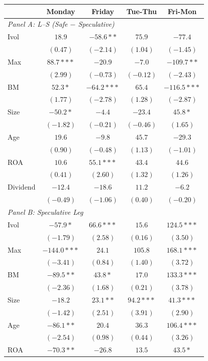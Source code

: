 \centering
\footnotesize
\begin{tabular}{l c c c c}
\toprule
 & Monday & Friday & Tue-Thu & Fri-Mon \\
\midrule
\multicolumn{5}{l}{\textit{Panel A: L--S (Safe $-$ Speculative)}} \\
Ivol & $18.9$ & $-58.6**$ & $75.9$ & $-77.4$ \\
 & $(0.47)$ & $(-2.14)$ & $(1.04)$ & $(-1.45)$ \\
Max & $88.7***$ & $-20.9$ & $-7.0$ & $-109.7**$ \\
 & $(2.99)$ & $(-0.73)$ & $(-0.12)$ & $(-2.43)$ \\
BM & $52.3*$ & $-64.2***$ & $65.4$ & $-116.5***$ \\
 & $(1.77)$ & $(-2.78)$ & $(1.28)$ & $(-2.87)$ \\
Size & $-50.2*$ & $-4.4$ & $-23.4$ & $45.8*$ \\
 & $(-1.82)$ & $(-0.21)$ & $(-0.46)$ & $(1.65)$ \\
Age & $19.6$ & $-9.8$ & $45.7$ & $-29.3$ \\
 & $(0.90)$ & $(-0.48)$ & $(1.13)$ & $(-1.01)$ \\
ROA & $10.6$ & $55.1***$ & $43.4$ & $44.6$ \\
 & $(0.41)$ & $(2.60)$ & $(1.32)$ & $(1.26)$ \\
Dividend & $-12.4$ & $-18.6$ & $11.2$ & $-6.2$ \\
 & $(-0.49)$ & $(-1.06)$ & $(0.40)$ & $(-0.20)$ \\
\midrule
\multicolumn{5}{l}{\textit{Panel B: Speculative Leg}} \\
Ivol & $-57.9*$ & $66.6***$ & $15.6$ & $124.5***$ \\
 & $(-1.79)$ & $(2.58)$ & $(0.16)$ & $(3.50)$ \\
Max & $-144.0***$ & $24.1$ & $105.8$ & $168.1***$ \\
 & $(-3.41)$ & $(0.84)$ & $(1.40)$ & $(3.72)$ \\
BM & $-89.5**$ & $43.8*$ & $17.0$ & $133.3***$ \\
 & $(-2.36)$ & $(1.68)$ & $(0.21)$ & $(3.78)$ \\
Size & $-18.2$ & $23.1**$ & $94.2***$ & $41.3***$ \\
 & $(-1.42)$ & $(2.51)$ & $(3.91)$ & $(2.90)$ \\
Age & $-86.1**$ & $20.4$ & $36.3$ & $106.4***$ \\
 & $(-2.54)$ & $(0.98)$ & $(0.44)$ & $(3.26)$ \\
ROA & $-70.3**$ & $-26.8$ & $13.5$ & $43.5*$ \\

\end{tabular}
